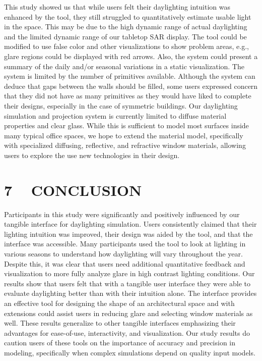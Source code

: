 \documentclass{article}
\begin{document}
This study showed us that while users felt their daylighting intuition
was enhanced by the tool, they still struggled to quantitatively
estimate usable light in the space.  This may be due to the high
dynamic range of actual daylighting and the limited dynamic range of
our tabletop SAR display.  The tool could be modified to use false
color and other visualizations to show problem areas, e.g., glare
regions could be displayed with red arrows.  Also, the system could
present a summary of the daily and/or seasonal variations in a static
visualization.  The system is limited by the number of primitives
available.  Although the system can deduce that gaps between the walls
should be filled, some users expressed concern that they did not have
as many primitives as they would have liked to complete their designs,
especially in the case of symmetric buildings.
%
Our daylighting simulation and projection system is currently limited
to diffuse material properties and clear glass.  While this is
sufficient to model most surfaces inside many typical office spaces,
we hope to extend the material model, specifically with specialized
diffusing, reflective, and refractive window materials, allowing users
to explore the use new technologies in their design.







\section{7 ~ CONCLUSION}

Participants in this study were significantly and positively
influenced by our tangible interface for daylighting simulation.
Users consistently claimed that their lighting intuition was improved,
their design was aided by the tool, and that the interface was
accessible.  Many participants used the tool to look at lighting in
various seasons to understand how daylighting will vary throughout the
year.  Despite this, it was clear that users need additional
quantitative feedback and visualization to more fully analyze glare in
high contrast lighting conditions.  Our results show that users felt
that with a tangible user interface they were able to evaluate
daylighting better than with their intuition alone.  The interface
provides an effective tool for designing the shape of an architectural
space and with extensions could assist users in reducing glare and
selecting window materials as well.  These results generalize to other
tangible interfaces emphasizing their advantages for ease-of-use,
interactivity, and visualization.  Our study results do caution users
of these tools on the importance of accuracy and precision in
modeling, specifically when complex simulations depend on quality
input models.
\end{document}
